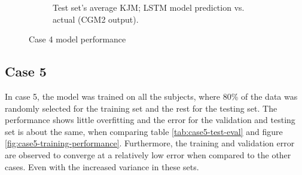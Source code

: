 \documentclass[../main.tex]{subfiles}
\begin{document}
\begin{figure}[!htb]
\begin{subfigure}[b]{0.515\textwidth}
         \label{fig:case4-prediction-performance}
         \caption{Test set's average \ac{KJM}; LSTM model prediction vs. actual (CGM2 output).}
     \end{subfigure}
    \caption{Case 4 model performance}
    \label{fig:case4-performance-plots}
\end{figure}


\subsection{Case 5}
\label{sec:results-case5}
In case 5, the model was trained on all the subjects, where 80\% of the data was randomly selected for the training set and the rest for the testing set.
The performance shows little overfitting and the error for the validation and testing set is about the same, when comparing table \ref{tab:case5-test-eval} and figure \ref{fig:case5-training-performance}.
Furthermore, the training and validation error are observed to converge at a relatively low error when compared to the other cases.
Even with the increased variance in these sets.
\end{document}
